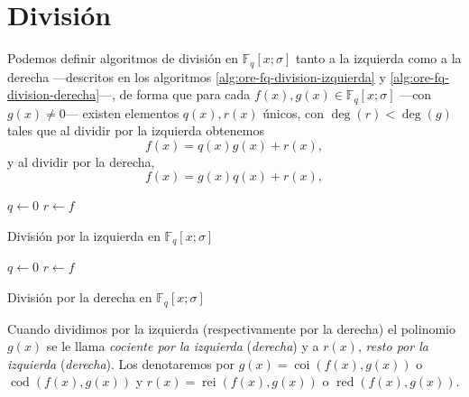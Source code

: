 \section{División}

Podemos definir algoritmos de división en \(\mathbb F_q[x; \sigma]\) tanto a la izquierda como a la derecha —descritos en los algoritmos \ref{alg:ore-fq-division-izquierda} y \ref{alg:ore-fq-division-derecha}—, de forma que para cada \(f(x), g(x) \in \mathbb F_q[x; \sigma]\) —con \(g(x) \neq 0\)— existen elementos \(q(x), r(x)\) únicos, con \(\deg(r) < \deg(g)\) tales que al dividir por la izquierda obtenemos
\[
  f(x) = q(x)g(x) + r(x),
\]
y al dividir por la derecha, 
\[
  f(x) = g(x)q(x) + r(x),
\]

\begin{Ualgorithm}[hb]
  \DontPrintSemicolon
  \(q \longleftarrow 0\)\;
  \(r \longleftarrow f\)\;
    \caption{División por la izquierda en \(\mathbb F_q[x; \sigma]\)}
  \label{alg:ore-fq-division-izquierda}
\end{Ualgorithm}

\begin{Ualgorithm}[htb]
  \DontPrintSemicolon
  \(q \longleftarrow 0\)\;
  \(r \longleftarrow f\)\;
    \caption{División por la derecha en \(\mathbb F_q[x; \sigma]\)
  }
  \label{alg:ore-fq-division-derecha}
\end{Ualgorithm}

Cuando dividimos por la izquierda (respectivamente por la derecha) el polinomio \(g(x)\) se le llama \textit{cociente por la izquierda} (\textit{derecha}) y a \(r(x)\), \textit{resto por la izquierda} (\textit{derecha}).
Los denotaremos por \(g(x) = \operatorname{coi}(f(x), g(x))\) o \(\operatorname{cod}(f(x), g(x))\) y \(r(x) = \operatorname{rei}(f(x), g(x))\) o \(\operatorname{red}(f(x), g(x))\).

